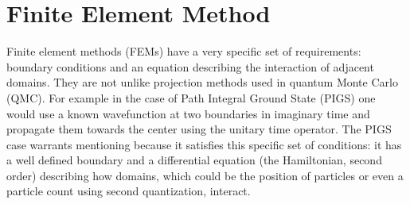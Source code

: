 \documentclass[12pt,times,twocolumn,3p]{elsarticle}
\begin{document}
\section{Finite Element Method} \label{sec:fem}
Finite element methods (FEMs) have a very specific set of requirements: boundary
conditions and an equation describing the interaction of adjacent domains. They
are not unlike projection methods used in quantum Monte Carlo (QMC). For example
in the case of Path Integral Ground State (PIGS) \cite{pigs} one would use a
known wavefunction at two boundaries in  imaginary time and propagate them towards
the center using the unitary time operator. The PIGS case warrants mentioning
because it satisfies this specific set of conditions: it has a well defined
boundary and a differential equation (the Hamiltonian, second order) describing
how domains, which could be the position of particles or even a particle count
using second quantization, interact.
\end{document}

